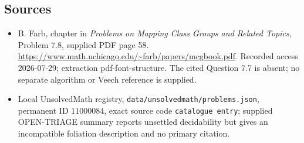 \documentclass[11pt]{article}
\begin{document}
\subsection{Sources}
\begin{itemize}
\item B. Farb, chapter in \emph{Problems on Mapping Class Groups and Related Topics}, Problem 7.8, supplied PDF page 58. \url{https://www.math.uchicago.edu/~farb/papers/mcgbook.pdf}. Recorded access 2026-07-29; extraction pdf-font-structure. The cited Question 7.7 is absent; no separate algorithm or Veech reference is supplied.
\item Local UnsolvedMath registry, \texttt{data/unsolvedmath/problems.json}, permanent ID \(11000084\), exact source code \texttt{catalogue entry}; supplied OPEN-TRIAGE summary reports unsettled decidability but gives an incompatible foliation description and no primary citation.
\end{itemize}
\end{document}
